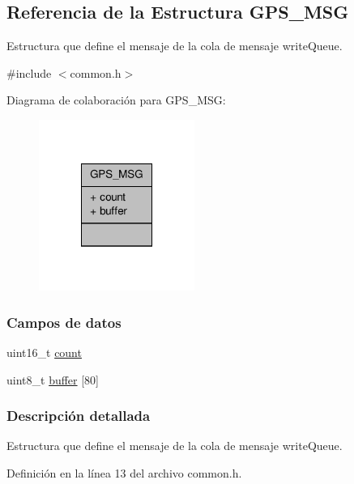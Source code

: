 \hypertarget{structGPS__MSG}{\subsection{Referencia de la Estructura G\+P\+S\+\_\+\+M\+S\+G}
\label{structGPS__MSG}
}


Estructura que define el mensaje de la cola de mensaje write\+Queue.  




{\ttfamily \#include $<$common.\+h$>$}



Diagrama de colaboración para G\+P\+S\+\_\+\+M\+S\+G\+:\nopagebreak
\begin{figure}[H]
\begin{center}
\leavevmode
\includegraphics[width=144pt]{structGPS__MSG__coll__graph}
\end{center}
\end{figure}
\subsubsection*{Campos de datos}
\begin{DoxyCompactItemize}
\item 
uint16\+\_\+t \hyperlink{structGPS__MSG_a4f0c127ec8708885192496df14c31a71}{count}
\item 
uint8\+\_\+t \hyperlink{structGPS__MSG_ac486c996a8a7a5edd1752baaea5b4571}{buffer} \mbox{[}80\mbox{]}
\end{DoxyCompactItemize}


\subsubsection{Descripción detallada}
Estructura que define el mensaje de la cola de mensaje write\+Queue. 

Definición en la línea 13 del archivo common.\+h.




